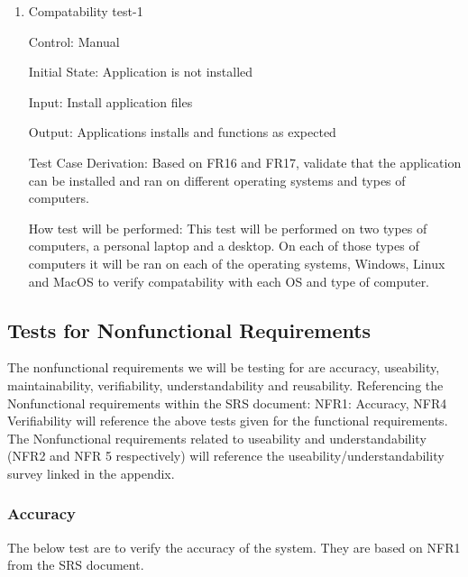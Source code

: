\documentclass[12pt, titlepage]{article}
\begin{document}
  \begin{enumerate}
  \item {Compatability test-1\\}
  
  Control: Manual
            
  Initial State: Application is not installed
            
  Input: Install application files
            
  Output: Applications installs and functions as expected
  
  Test Case Derivation: Based on FR16 and FR17, validate that the application can be installed and ran on different operating systems and types of computers. 
  
  How test will be performed: This test will be performed on two types of computers, a personal laptop and a desktop. On each of those types of computers it will be ran on each of the operating systems, Windows, Linux and MacOS to verify compatability with each OS and type of computer.

  \end{enumerate}

\subsection{Tests for Nonfunctional Requirements}

\noindent The nonfunctional requirements we will be testing for are accuracy, useability, maintainability, verifiability, understandability and reusability. 
Referencing the Nonfunctional requirements within the SRS document: NFR1: Accuracy, NFR4 Verifiability will reference the above tests given for the functional requirements. 
The Nonfunctional requirements related to useability and understandability (NFR2 and NFR 5 respectively) will reference the useability/understandability survey linked in the appendix.

\subsubsection{Accuracy}

The below test are to verify the accuracy of the system.
They are based on NFR1 from the SRS document.
\end{document}
